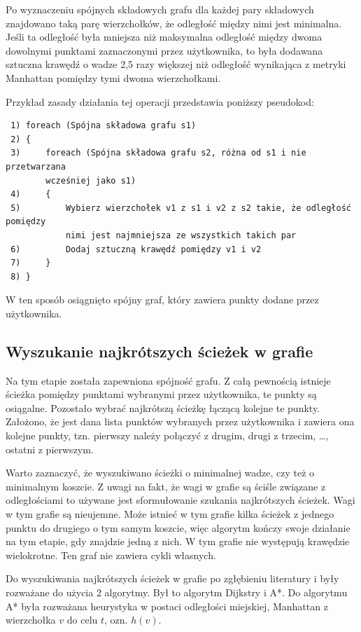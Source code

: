 \documentclass[a4paper,11pt,twoside,openright]{report}
\theoremstyle{definition}
\begin{document}
Po wyznaczeniu spójnych składowych grafu dla każdej pary składowych znajdowano taką parę wierzchołków, że odległość między nimi jest minimalna. Jeśli ta odległość była mniejsza niż maksymalna odległość między dwoma dowolnymi punktami zaznaczonymi przez użytkownika, to była dodawana sztuczna krawędź o wadze 2,5 razy większej niż odległość wynikająca z metryki Manhattan pomiędzy tymi dwoma wierzchołkami.

Przykład zasady działania tej operacji przedstawia poniższy pseudokod:

\begin{verbatim}
 1) foreach (Spójna składowa grafu s1)
 2) {
 3)     foreach (Spójna składowa grafu s2, różna od s1 i nie przetwarzana
        wcześniej jako s1)
 4)     {
 5)         Wybierz wierzchołek v1 z s1 i v2 z s2 takie, że odległość pomiędzy
            nimi jest najmniejsza ze wszystkich takich par
 6)         Dodaj sztuczną krawędź pomiędzy v1 i v2
 7)     }
 8) }
\end{verbatim}


W ten sposób osiągnięto spójny graf, który zawiera punkty dodane przez użytkownika.

\subsection {Wyszukanie najkrótszych ścieżek w grafie}

Na tym etapie została zapewniona spójność grafu. Z całą pewnością istnieje ścieżka pomiędzy punktami wybranymi przez użytkownika, te punkty są osiągalne. Pozostało wybrać najkrótszą ścieżkę łączącą kolejne te punkty. Założono, że jest dana lista punktów wybranych przez użytkownika i zawiera ona kolejne punkty, tzn. pierwszy należy połączyć z drugim, drugi z trzecim, \dots, ostatni z pierwszym.

Warto zaznaczyć, że wyszukiwano ścieżki o minimalnej wadze, czy też o minimalnym koszcie. Z uwagi na fakt, że wagi w grafie są ściśle związane z odległościami to używane jest sformułowanie szukania najkrótszych ścieżek. Wagi w tym grafie są nieujemne. Może istnieć w tym grafie kilka ścieżek z jednego punktu do drugiego o tym samym koszcie, więc algorytm kończy swoje działanie na tym etapie, gdy znajdzie jedną z nich. W tym grafie nie występują krawędzie wielokrotne. Ten graf nie zawiera cykli własnych.

Do wyszukiwania najkrótszych ścieżek w grafie po zgłębieniu literatury \cite{Algorytmy Sedgewick} i \cite{AiSD2} były rozważane do użycia 2 algorytmy. Był to algorytm Dijkstry i A*. Do algorytmu A* była rozważana heurystyka w postaci odległości miejskiej, Manhattan z wierzchołka $v$ do celu $t$, ozn. $h(v)$.
\end{document}

